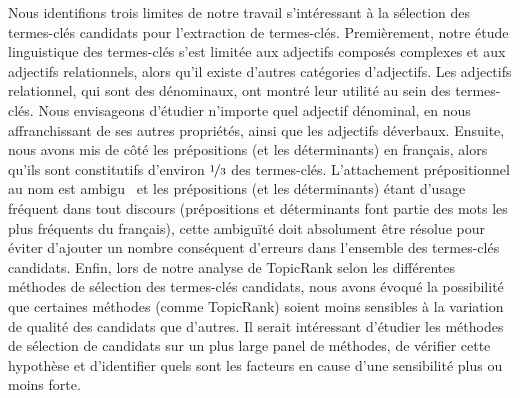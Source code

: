     Nous identifions trois limites de notre travail s'intéressant à la sélection
    des termes-clés candidats pour l'extraction de termes-clés. Premièrement,
    notre étude linguistique des termes-clés s'est limitée aux adjectifs
    composés complexes et aux adjectifs relationnels, alors qu'il existe
    d'autres catégories d'adjectifs. Les adjectifs relationnel, qui sont des
    dénominaux, ont montré leur utilité au sein des termes-clés. Nous
    envisageons d'étudier n'importe quel adjectif dénominal, en nous
    affranchissant de ses autres propriétés, ainsi que les adjectifs déverbaux.
    Ensuite, nous avons mis de côté les prépositions (et les déterminants) en
    français, alors qu'ils sont constitutifs d'environ $\unitfrac{1}{3}$ des
    termes-clés. L'attachement prépositionnel au nom est
    ambigu~\cite{colonna2002ambiguitesyntaxique} et les prépositions (et les
    déterminants) étant d'usage fréquent dans tout discours (prépositions et
    déterminants font partie des mots les plus fréquents du français), cette
    ambiguïté doit absolument être résolue pour éviter d'ajouter un nombre
    conséquent d'erreurs dans l'ensemble des termes-clés candidats.
    Enfin, lors de notre analyse de
    TopicRank selon les différentes méthodes de sélection des termes-clés
    candidats, nous avons évoqué la possibilité que certaines méthodes (comme
    TopicRank) soient moins sensibles à la variation de qualité des candidats
    que d'autres. Il serait intéressant d'étudier les méthodes de sélection de
    candidats sur un plus large panel de méthodes, de vérifier cette hypothèse
    et d'identifier quels sont les facteurs en cause d'une sensibilité plus ou
    moins forte.


